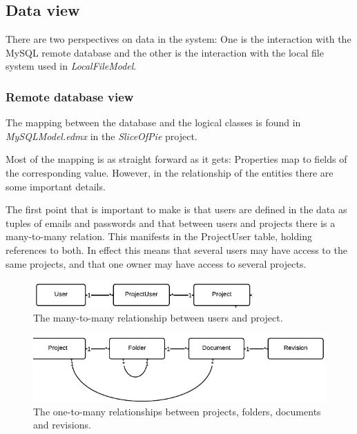 \subsection{Data view}

There are two perspectives on data in the system: One is the interaction with the MySQL remote database
and the other is the interaction with the local file system used in \emph{LocalFileModel}.

\subsubsection{Remote database view}
The mapping between the database and the logical classes is found in \\\emph{MySQLModel.edmx} in the
\emph{SliceOfPie} project.

Most of the mapping is as straight forward as it gets: Properties map to fields of the corresponding value.
However, in the relationship of the entities there are some important details.

The first point that is important to make is that users are defined in the data as tuples of emails
and passwords and that between users and projects there is a many-to-many relation. This manifests
in the ProjectUser table, holding references to both. In effect this means that several users may 
have access to the same projects, and that one owner may have access to several projects.

\begin{figure}[htb]
	\centering
	\includegraphics[width=0.75\textwidth]{Software_architecture/graphics/db-user-project.png}
	\caption{The many-to-many relationship between users and project.}
	\label{fig:db-user-project}
\end{figure}

\begin{figure}[htb]
	\centering
	\includegraphics[width=1.0\textwidth]{Software_architecture/graphics/db-project-folder-document.png}
	\caption{The one-to-many relationships between projects, folders, documents and revisions.}
	\label{fig:db-project-folder-document}
\end{figure}

